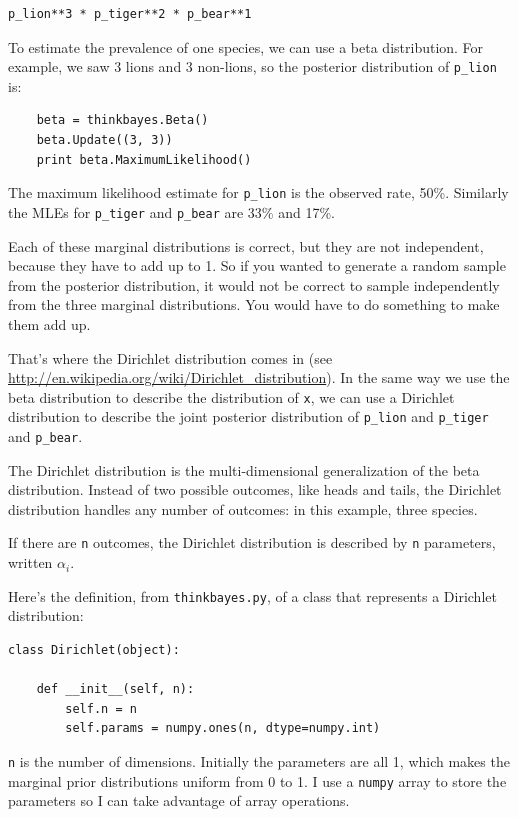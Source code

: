 \documentclass[12pt]{book}
\begin{document}
\begin{verbatim}
p_lion**3 * p_tiger**2 * p_bear**1
\end{verbatim}

To estimate the prevalence of one species, we can use a beta
distribution.  For example, we saw 3 lions and 3 non-lions, so the
posterior distribution of \verb"p_lion" is:

\begin{verbatim}
    beta = thinkbayes.Beta()
    beta.Update((3, 3))
    print beta.MaximumLikelihood()
\end{verbatim}

The maximum likelihood estimate for \verb"p_lion" is the observed
rate, 50\%.  Similarly the MLEs for  \verb"p_tiger" and \verb"p_bear"
are 33\% and 17\%.

Each of these marginal distributions is correct, but they are
not independent, because they have to add up to 1.  So if you wanted
to generate a random sample from the posterior distribution, it would
not be correct to sample independently from the three marginal
distributions.  You would have to do something to make them add
up.

That's where the Dirichlet distribution comes in (see
\url{http://en.wikipedia.org/wiki/Dirichlet_distribution}).  In the
same way we use the beta distribution to describe the distribution of
{\tt x}, we can use a Dirichlet distribution to describe the joint
posterior distribution of \verb"p_lion" and \verb"p_tiger" and
\verb"p_bear".

The Dirichlet distribution is the multi-dimensional generalization
of the beta distribution.  Instead of two possible outcomes, like
heads and tails, the Dirichlet distribution handles any number of
outcomes: in this example, three species.

If there are {\tt n} outcomes, the Dirichlet distribution is
described by {\tt n} parameters, written $\alpha_i$.

Here's the definition, from {\tt thinkbayes.py}, of a class that
represents a Dirichlet distribution:

\begin{verbatim}
class Dirichlet(object):

    def __init__(self, n):
        self.n = n
        self.params = numpy.ones(n, dtype=numpy.int)
\end{verbatim}

{\tt n} is the number of dimensions.  Initially the parameters
are all 1, which makes the marginal prior distributions uniform
from 0 to 1.  I use a {\tt numpy} array to store the parameters
so I can take advantage of array operations.
\end{document}
